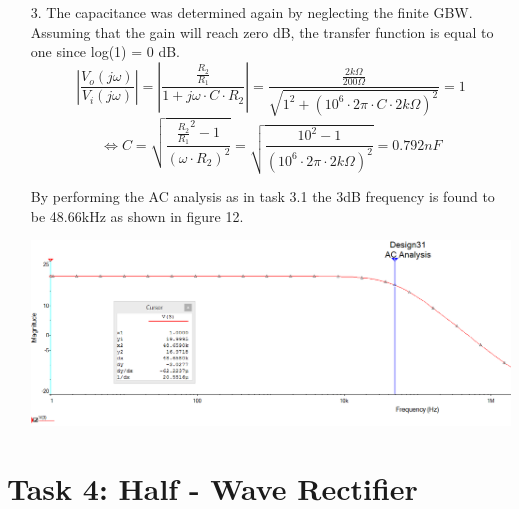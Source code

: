 \documentclass[11pt,a4paper]{article}
\begin{document}
\begin{enumerate}
\begin{minipage}{\linewidth}
    \end{minipage} 
    \pagebreak
  \item[3.]
  The capacitance was determined again by neglecting the finite GBW. Assuming that the gain will reach zero dB, the transfer function is equal to one since log(1) = 0 dB. 
  $$| \frac{V_o(j\omega)}{V_i(j\omega)} | = | \frac{\frac{R_2}{R_1}}{1+j\omega \cdot C \cdot R_2} | = \frac{\frac{2k\Omega}{200\Omega}}{\sqrt{1^2+(10^6 \cdot 2\pi \cdot C \cdot 2k\Omega)^2}} = 1$$
  $$\Leftrightarrow C = \sqrt{\frac{\frac{R_2}{R_1}^2-1}{(\omega \cdot R_2)^2}}  = \sqrt{\frac{10^2-1}{(10^6 \cdot 2\pi \cdot 2k\Omega)^2}} = 0.792nF$$
  
By performing the AC analysis as in task 3.1 the 3dB frequency is found to be 48.66kHz as shown in figure 12.\\
\begin{minipage}{\linewidth}
    	\centering       
        \includegraphics[width=14cm]{Task3_3.png}
    \end{minipage}
\end{enumerate}



\pagebreak
\section*{Task 4: Half - Wave Rectifier}
\end{document}
